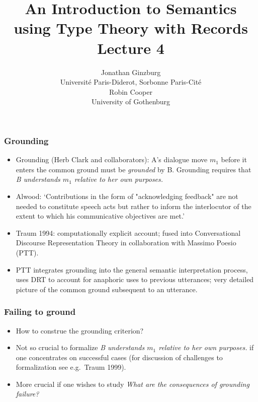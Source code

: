\documentclass{beamer}
\title{An Introduction to  Semantics using Type Theory with Records \\
  Lecture 4     }
\author{Jonathan Ginzburg\\
Universit\'e Paris-Diderot, Sorbonne Paris-Cit\'e\\
Robin Cooper\\ 
University of Gothenburg}
\date{}
\newcommand{\bit}{\begin{itemize}}
\newcommand{\eit}{\end{itemize}}
\newcommand{\ignore}[1]{}
\begin{document}
\maketitle


\ignore{
Lecture 4.
We provide a unified theory of metacommunicative and illocutionary interaction on the basis of the notion of Austinian locutionary propositions. This provides a basis for describing various linguistic phenomena occuring during grounding and clarification interaction.
}





\begin{frame}\frametitle{Grounding}


    
\bit


\item Grounding (Herb Clark and collaborators): A's dialogue move
  $m_{1}$ before it enters the common ground must be {\it grounded} by
  B. Grounding requires that {\it B understands $m_{1}$ relative to
    her own purposes.}
    
    
    \item Alwood:  `Contributions in the form of "acknowledging
feedback" are not needed to
constitute speech acts but rather to inform the interlocutor of the
extent to which his communicative objectives are met.'

\item Traum  1994: computationally explicit account; 
 fused into Conversational Discourse Representation Theory in
 collaboration with Massimo Poesio (PTT).

\item PTT
integrates grounding into the general semantic interpretation process, uses
DRT to account for anaphoric uses to previous utterances;
very detailed picture of the  common ground
subsequent to an utterance. 

\eit\end{frame}

\begin{frame}\frametitle{Failing to ground}

\bit
\item How to construe the grounding criterion?


\item Not so crucial to formalize {\it B understands $m_{1}$ relative to
    her own purposes.} if one concentrates on successful cases (for
  discussion of challenges to formalization see e.g.\ Traum 1999).


\item More crucial if one wishes to study {\it What are the
  consequences of grounding failure?}



\eit\end{frame}
\end{document}
